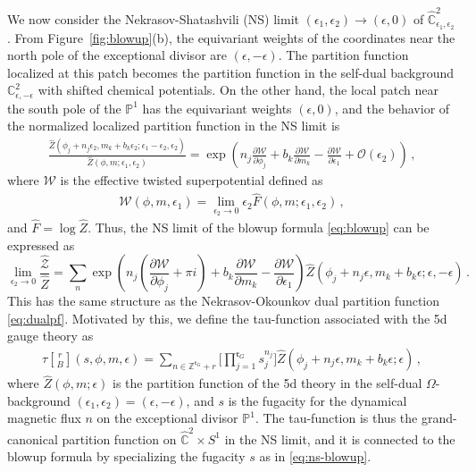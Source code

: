\documentclass[11pt, a4paper]{article}
\theoremstyle{definition}
\begin{document}
We now consider the Nekrasov-Shatashvili (NS) limit $ (\epsilon_1, \epsilon_2) \to (\epsilon, 0) $ of $ \hat{\mathbb{C}}^2_{\epsilon_1,\epsilon_2} $. From Figure~\ref{fig:blowup}(b), the equivariant weights of the coordinates near the north pole of the exceptional divisor are $ (\epsilon,-\epsilon) $. The partition function localized at this patch becomes the partition function in the self-dual background $ \mathbb{C}^2_{\epsilon,-\epsilon} $ with shifted chemical potentials. On the other hand, the local patch near the south pole of the $ \mathbb{P}^1 $ has the equivariant weights $ (\epsilon, 0) $, and the behavior of the normalized localized partition function in the NS limit is
\begin{align}
    \frac{\hat{Z}(\phi_j+n_j \epsilon_2, m_k+b_k \epsilon_2; \epsilon_1-\epsilon_2, \epsilon_2)}{\hat{Z}(\phi,m;\epsilon_1,\epsilon_2)} = \exp\left(n_j \frac{\partial \mathcal{W}}{\partial \phi_j} + b_k \frac{\partial \mathcal{W}}{\partial m_k} - \frac{\partial \mathcal{W}}{\partial \epsilon_1} + \mathcal{O}(\epsilon_2) \right) \, ,
\end{align}
where $ \mathcal{W} $ is the effective twisted superpotential defined as
\begin{align}
    \mathcal{W}(\phi,m,\epsilon_1) = \lim_{\epsilon_2 \to 0} \epsilon_2 \hat{F}(\phi,m;\epsilon_1,\epsilon_2) \, ,
\end{align}
and $\hat{F}=
\log \hat Z$.
Thus, the NS limit of the blowup formula \eqref{eq:blowup} can be expressed as
\begin{equation}\label{eq:ns-blowup}
    \lim_{\epsilon_2 \to 0} \frac{\hat{\mathcal{Z}}}{\hat{Z}} = \sum_n \exp\left(n_j \left( \frac{\partial \mathcal{W}}{\partial \phi_j} + \pi i \right) + b_k \frac{\partial \mathcal{W}}{\partial m_k} - \frac{\partial \mathcal{W}}{\partial \epsilon_1} \right) \hat{Z}(\phi_j+n_j \epsilon, m_k+b_k \epsilon; \epsilon, -\epsilon) \, .
\end{equation}
This has the same structure as the Nekrasov-Okounkov dual partition function \eqref{eq:dualpf}. Motivated by this, we define the tau-function associated with the 5d gauge theory as \cite{Bershtein:2018srt, Bonelli:2024wha, Bonelli:2025juz}
\begin{align}\label{eq:tau}
    \tau\genfrac[]{0pt}{1}{r}{B}(s,\phi,m,\epsilon) = \sum_{n\in \mathbb{Z}^{\mathfrak{r}_G}+r} \bigg[ \prod_{j=1}^{\mathfrak{r}_G} s_j^{n_j} \bigg] \hat{Z}(\phi_j+n_j \epsilon, m_k+b_k \epsilon; \epsilon) \, ,
\end{align}
where $ \hat{Z}(\phi,m;\epsilon) $ is the partition function of the 5d theory in the self-dual $ \Omega $-background $ (\epsilon_1, \epsilon_2)=(\epsilon,-\epsilon) $, and $ s $ is the fugacity for the dynamical magnetic flux $ n $ on the exceptional divisor $ \mathbb{P}^1 $. The tau-function is thus the grand-canonical partition function on $ \hat{\mathbb{C}}^2 \times S^1 $ in the NS limit, and it is connected to the blowup formula by specializing the fugacity $ s $ as in \eqref{eq:ns-blowup}.
\end{document}
